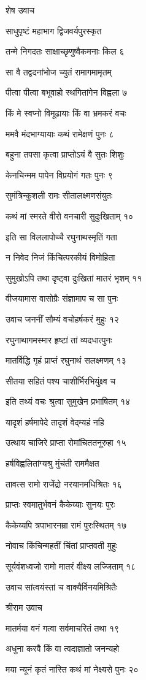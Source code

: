शेष उवाच

साधुपृष्टं महाभाग द्विजवर्यपुरस्कृत

तन्मे निगदतः साक्षाच्छृणुष्वैकमनाः किल ६

सा वै तद्वदनांभोज च्युतं रामागमामृतम्

पीत्वा पीत्वा बभूवाहो स्थगितांगेन विह्वला ७

किं मे स्वप्नो विमूढायाः किं वा भ्रमकरं वचः

ममवै मंदभाग्यायाः कथं रामेक्षणं पुनः ८

बहुना तपसा कृत्वा प्राप्तोऽयं वै सुतः शिशुः

केनचिन्मम पापेन विप्रयोगं गतः पुनः ९

सुमंत्रिन्कुशली रामः सीतालक्ष्मणसंयुतः

कथं मां स्मरते वीरो वनचारी सुदुःखिताम् १०

इति सा विललापोच्चै रघुनाथस्मृतिं गता

न निवेद निजं किंचित्परकीयं विमोहिता

सुमुखोऽपि तथा दृष्ट्वा दुःखितां मातरं भृशम् ११

वीजयामास वासोग्रैः संज्ञामाप च सा पुनः

उवाच जननीं सौम्यं वचोहर्षकरं मुहुः १२

रघुनाथागमस्मार हृष्टां तां व्यदधात्पुनः

मातर्विद्धि गृहं प्राप्तं रघुनाथं सलक्ष्मणम् १३

सीतया सहितं पश्य चाशीर्भिरभियुंक्ष्व च

इति तथ्यं वचः श्रुत्वा सुमुखेन प्रभाषितम् १४

यादृशं हर्षमापेदे तादृशं वेद्म्यहं नहि

उत्थाय चाजिरे प्राप्ता रोमांचिततनूरुहा १५

हर्षविह्वलितांग्यश्रु मुंचंती राममैक्षत

तावत्स रामो राजेंद्रो नरयानमधिश्रितः १६

प्राप्तः स्वमातुर्भवनं कैकेय्याः सुनयः पुरः

कैकेय्यपि त्रपाभारनम्रा रामं पुरःस्थितम् १७

नोवाच किंचिन्महतीं चिंतां प्राप्तवती मुहुः

सूर्यवंशध्वजो रामो मातरं वीक्ष्य लज्जिताम् १८

उवाच सांत्वयंस्तां च वाक्यैर्विनयमिश्रितैः

श्रीराम उवाच

मातर्मया वनं गत्वा सर्वमाचरितं तथा १९

अधुना करवै किं वा त्वदाज्ञातो जनन्यहो

मया न्यूनं कृतं नास्ति कथं मां नेक्ष्यसे पुनः २०


